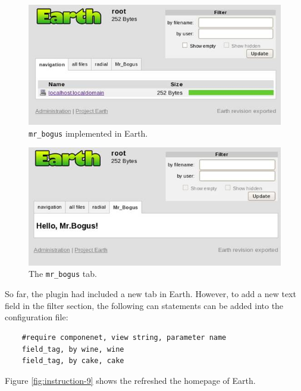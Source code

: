 \documentclass{article}
\begin{document}
\begin{figure}
\begin{centering}        
\includegraphics[width=150mm]{fig/instruction-6}
\end{centering}
\caption{\texttt{mr\_bogus} implemented in Earth.}
\label{fig:instruction-6}
\end{figure}

\begin{figure}
\begin{centering}    
\includegraphics[width=150mm]{fig/instruction-7}
\end{centering}
\caption{The \texttt{mr\_bogus} tab.}
\label{fig:instruction-7}
\end{figure}

So far, the plugin had included a new tab in Earth. However, to add a new text field in the filter section, the following can statements can be added into the configuration file:

\begin{verbatim}
    #require componenet, view string, parameter name
    field_tag, by wine, wine
    field_tag, by cake, cake
\end{verbatim}

Figure \ref{fig:instruction-9} shows the refreshed the homepage of Earth.
\end{document}
